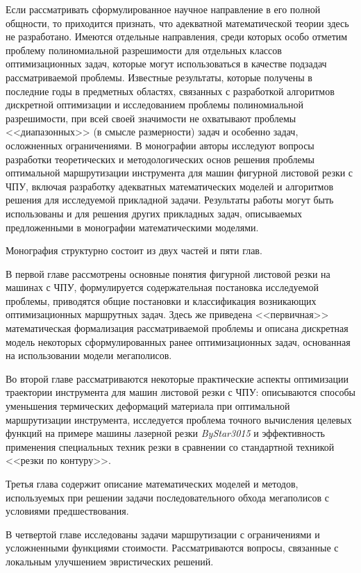 \documentclass[11pt,twoside,openany]{report}
\begin{document}
Если рассматривать сформулированное научное направление в его полной общности,
то приходится признать, что адекватной математической теории здесь не разработано.
Имеются отдельные направления, среди которых особо отметим проблему полиномиальной разрешимости
для отдельных классов оптимизационных задач,
которые могут использоваться в качестве подзадач рассматриваемой проблемы.
Известные результаты, которые получены в последние годы в предметных областях,
связанных с разработкой алгоритмов дискретной оптимизации
и исследованием проблемы полиномиальной разрешимости,
при всей своей значимости не охватывают проблемы <<диапазонных>>
(в смысле размерности) задач и особенно задач,
осложненных ограничениями.
В монографии авторы исследуют вопросы разработки
теоретических и методологических основ решения проблемы
оптимальной маршрутизации инструмента для машин фигурной листовой резки с ЧПУ,
включая разработку адекватных математических моделей
и алгоритмов решения для исследуемой прикладной задачи.
Результаты работы могут быть использованы и для решения
других прикладных задач,
описываемых предложенными в монографии математическими моделями.

Монография структурно состоит из двух частей и пяти глав.

В первой главе рассмотрены основные понятия
фигурной листовой резки на машинах с ЧПУ,
формулируется содержательная постановка исследуемой проблемы,
приводятся общие постановки и классификация
возникающих оптимизационных маршрутных задач.
Здесь же приведена <<первичная>> математическая формализация
рассматриваемой проблемы и описана дискретная модель
некоторых сформулированных ранее оптимизационных задач,
основанная на использовании модели мегаполисов.

Во второй главе рассматриваются некоторые
практические аспекты оптимизации траектории
инструмента для машин листовой резки с ЧПУ:
описываются способы уменьшения термических деформаций
материала при оптимальной маршрутизации инструмента,
исследуется проблема точного вычисления целевых функций
на примере машины лазерной резки
\textit{ByStar3015}
и эффективность применения специальных техник резки
в сравнении со стандартной техникой <<резки по контуру>>.

Третья глава содержит описание математических моделей и методов,
используемых при решении задачи последовательного обхода
мегаполисов с условиями предшествования.

В четвертой главе исследованы задачи маршрутизации
с ограничениями и усложненными функциями стоимости.
Рассматриваются вопросы, связанные с
локальным улучшением эвристических решений.
\end{document}
